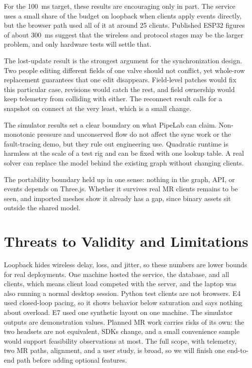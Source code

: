 \documentclass[conference]{IEEEtran}
\begin{document}
For the 100~ms target, these results are encouraging only in part. The service uses a small share of the budget on loopback when clients apply events directly, but the browser path used all of it at around 25 clients. Published ESP32 figures of about 300~ms \cite{amirkhanov2025evaluating} suggest that the wireless and protocol stages may be the larger problem, and only hardware tests will settle that.

The lost-update result is the strongest argument for the synchronization design. Two people editing different fields of one valve should not conflict, yet whole-row replacement guarantees that one edit disappears. Field-level patches would fix this particular case, revisions would catch the rest, and field ownership would keep telemetry from colliding with either. The reconnect result calls for a snapshot on connect at the very least, which is a small change.

The simulator results set a clear boundary on what PipeLab can claim. Non-monotonic pressure and unconserved flow do not affect the sync work or the fault-tracing demo, but they rule out engineering use. Quadratic runtime is harmless at the scale of a test rig and can be fixed with one lookup table. A real solver can replace the model behind the existing graph without changing clients.

The portability boundary held up in one sense: nothing in the graph, API, or events depends on Three.js. Whether it survives real MR clients remains to be seen, and imported meshes show it already has a gap, since binary assets sit outside the shared model.

\section{Threats to Validity and Limitations}
Loopback hides wireless delay, loss, and jitter, so these numbers are lower bounds for real deployments. One machine hosted the service, the database, and all clients, which means client load competed with the server, and the laptop was also running a normal desktop session. Python test clients are not browsers. E4 used closed-loop pacing, so it shows behavior below saturation and says nothing about overload. E7 used one synthetic layout on one machine. The simulator outputs are demonstration values. Planned MR work carries risks of its own: the two headsets are not equivalent, SDKs change, and a small convenience sample would support feasibility observations at most. The full scope, with telemetry, two MR paths, alignment, and a user study, is broad, so we will finish one end-to-end path before adding optional features.
\end{document}
